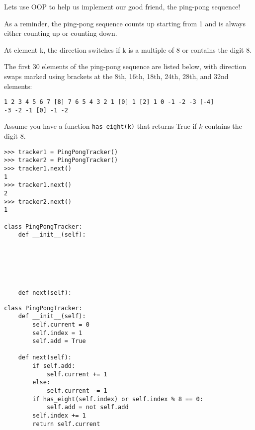\begin{blocksection}
\question Lets use OOP to help us implement our good friend, the ping-pong sequence!

As a reminder, the ping-pong sequence counts up starting from 1 and is
always either counting up or counting down.

At element k, the direction switches if k is a multiple of 8 or contains the
digit 8.

The first 30 elements of the ping-pong sequence are listed below, with direction
swaps marked using brackets at the 8th, 16th, 18th, 24th, 28th, and 32nd
elements:
\begin{lstlisting}
1 2 3 4 5 6 7 [8] 7 6 5 4 3 2 1 [0] 1 [2] 1 0 -1 -2 -3 [-4]
-3 -2 -1 [0] -1 -2
\end{lstlisting}

Assume you have a function \texttt{has\_eight(k)} that returns True if $k$ contains the digit 8.

\vspace{2\baselineskip}
\begin{nonsol}
\begin{lstlisting}
>>> tracker1 = PingPongTracker()
>>> tracker2 = PingPongTracker()
>>> tracker1.next()
1
>>> tracker1.next()
2
>>> tracker2.next()
1

class PingPongTracker:
    def __init__(self):






    def next(self):
\end{lstlisting}
\end{nonsol}

\begin{solution}[0.3in]
\begin{lstlisting}
class PingPongTracker:
    def __init__(self):
        self.current = 0
        self.index = 1
        self.add = True

    def next(self):
        if self.add:
            self.current += 1
        else:
            self.current -= 1
        if has_eight(self.index) or self.index % 8 == 0:
            self.add = not self.add
        self.index += 1
        return self.current

\end{lstlisting}
\end{solution}

\end{blocksection}
